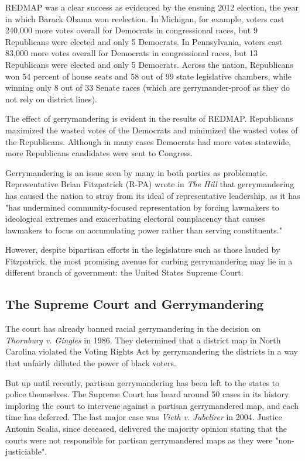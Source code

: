 \documentclass[sigconf]{acmart}
\begin{document}
REDMAP was a clear success as evidenced by the ensuing 2012 election, the year in which Barack Obama won reelection. In Michigan, for example, voters cast 240,000 more votes overall for Democrats in congressional races, but 9 Republicans were elected and only 5 Democrats. In Pennsylvania, voters cast 83,000 more votes overall for Democrats in congressional races, but 13 Republicans were elected and only 5 Democrats. Across the nation, Republicans won 54 percent of house seats and 58 out of 99 state legislative chambers, while winning only 8 out of 33 Senate races (which are gerrymander-proof as they do not rely on district lines).\cite{redmap}

The effect of gerrymandering is evident in the results of REDMAP. Republicans maximized the wasted votes of the Democrats and minimized the wasted votes of the Republicans. Although in many cases Democrats had more votes statewide, more Republicans candidates were sent to Congress. 

Gerrymandering is an issue seen by many in both parties as problematic. Representative Brian Fitzpatrick (R-PA) wrote in \textit{The Hill} that gerrymandering has caused the nation to stray from its ideal of representative leadership, as it has "has undermined community-focused representation by forcing lawmakers to ideological extremes and exacerbating electoral complacency that causes lawmakers to focus on accumulating power rather than serving constituents."\cite{bipartisan}

However, despite bipartisan efforts in the legislature such as those lauded by Fitzpatrick, the most promising avenue for curbing gerrymandering may lie in a different branch of government: the United States Supreme Court. 

\subsection{The Supreme Court and Gerrymandering}
The court has already banned racial gerrymandering in the decision on \textit{Thornburg v. Gingles} in 1986. They determined that a district map in North Carolina violated the Voting Rights Act by gerrymandering the districts in a way that unfairly dilluted the power of black voters.\cite{thornburg}

But up until recently, partisan gerrymandering has been left to the states to police themselves. The Supreme Court has heard around 50 cases in its history imploring the court to intervene against a partisan gerrymandered map, and each time has deferred.\cite{chicago} The last major case was \textit{Vieth v. Jubelirer} in 2004. Justice Antonin Scalia, since deceased, delivered the majority opinion stating that the courts were not responsible for partisan gerrymandered maps as they were "non-justiciable".\cite{wapo}
\end{document}
